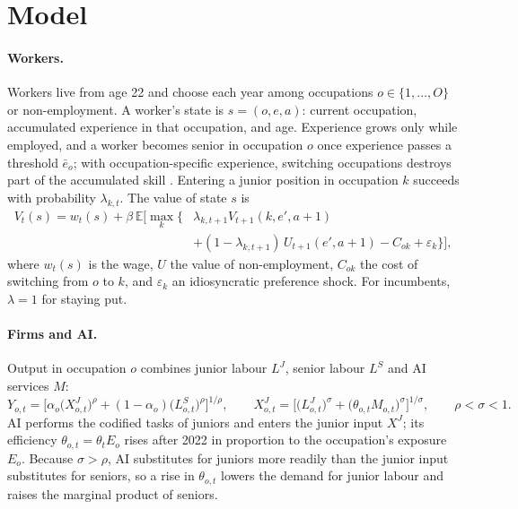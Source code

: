 \documentclass[11pt,a4paper]{article}
\begin{document}
\section{Model}

\paragraph{Workers.} Workers live from age 22 and choose each year among occupations $o \in \{1,\dots,O\}$ or non-employment. A worker's state is $s=(o, e, a)$: current occupation, accumulated experience in that occupation, and age. Experience grows only while employed, and a worker becomes senior in occupation $o$ once experience passes a threshold $\bar{e}_o$; with occupation-specific experience, switching occupations destroys part of the accumulated skill \citep{keane1997, dixcarneiro2014}. Entering a junior position in occupation $k$ succeeds with probability $\lambda_{k,t}$. The value of state $s$ is
\begin{equation}
\begin{aligned}
V_t(s) = w_t(s) + \beta\, \mathbb{E}\Big[\max_{k}\big\{ & \lambda_{k,t+1}V_{t+1}(k,e',a+1) \\
 & + (1-\lambda_{k,t+1})\,U_{t+1}(e',a+1) - C_{ok} + \varepsilon_{k}\big\}\Big],
\end{aligned}
\end{equation}
where $w_t(s)$ is the wage, $U$ the value of non-employment, $C_{ok}$ the cost of switching from $o$ to $k$, and $\varepsilon_k$ an idiosyncratic preference shock. For incumbents, $\lambda=1$ for staying put.

\paragraph{Firms and AI.} Output in occupation $o$ combines junior labour $L^{J}$, senior labour $L^{S}$ and AI services $M$:
\begin{equation}
Y_{o,t} = \Big[\alpha_o \big(X^{J}_{o,t}\big)^{\rho} + (1-\alpha_o)\big(L^{S}_{o,t}\big)^{\rho}\Big]^{1/\rho}, \qquad X^{J}_{o,t} = \Big[\big(L^{J}_{o,t}\big)^{\sigma} + \big(\theta_{o,t}M_{o,t}\big)^{\sigma}\Big]^{1/\sigma}, \qquad \rho < \sigma < 1.
\end{equation}
AI performs the codified tasks of juniors and enters the junior input $X^{J}$; its efficiency $\theta_{o,t}=\theta_t E_o$ rises after 2022 in proportion to the occupation's exposure $E_o$. Because $\sigma>\rho$, AI substitutes for juniors more readily than the junior input substitutes for seniors, so a rise in $\theta_{o,t}$ lowers the demand for junior labour and raises the marginal product of seniors.
\end{document}

